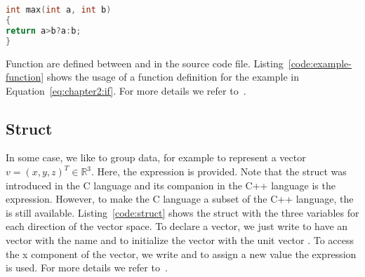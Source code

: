\begin{lstlisting}[language=c++,caption={Example for a function definition to compute the maximum of two numbers.\label{code:functions:max}},float,floatplacement=tb]
int max(int a, int b)
{
return a>b?a:b;
}
\end{lstlisting}

Function are defined between  and  in the source code file. Listing~\ref{code:example-function} shows the usage of a function definition for the example in Equation~\ref{eq:chapter2:if}. For more details we refer to~\cite[Chapter~4]{andrew2000accelerated}.




\subsection{Struct}
\label{sec:struct}
In some case, we like to group data, for example to represent a vector $v=(x,y,z)^T\in \mathbb{R}^3$. Here, the  expression is provided. Note that the struct was introduced in the C language and its companion in the C++ language is the  expression. However, to make the C language a subset of the C++ language, the  is still available. Listing~\ref{code:struct} shows the struct with the three variables for each direction of the vector space. To declare a vector, we just write  to have an vector with the name  and to initialize the vector with the unit vector . To access the x component of the vector, we write  and to assign a new value the expression  is used. For more details we refer to~\cite[Chapter~4]{andrew2000accelerated}.

